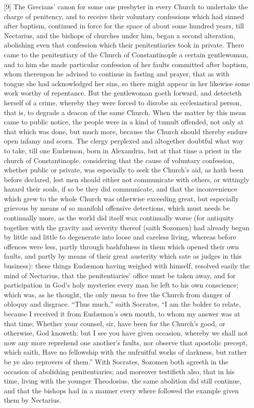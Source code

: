 [9] The Grecians’ canon for some one presbyter in every Church to undertake the charge of penitency, and to receive their voluntary confessions which had sinned after baptism, continued in force for the space of about some hundred years, till Nectarius, and the bishops of churches under him, began a second alteration, abolishing even that confession which their penitentiaries took in private. There came to the penitentiary of the Church of Constantinople a certain gentlewoman, and to him she made particular confession of her faults committed after baptism, whom thereupon he advised to continue in fasting and prayer, that as with tongue she had acknowledged her sins, so there might appear in her likewise some work worthy of repentance. But the gentlewoman goeth forward, and detecteth herself of a crime, whereby they were forced to disrobe an ecclesiastical person, that is, to degrade a deacon of the same Church. When the matter by this mean came to public notice, the people were in a kind of tumult offended, not only at that which was done,  but much more, because the Church should thereby endure open infamy and scorn. The clergy perplexed and altogether doubtful what way to take, till one Eudæmon, born in Alexandria, but at that time a priest in the church of Constantinople, considering that the cause of voluntary confession, whether public or private, was especially to seek the Church’s aid, as hath been before declared, lest men should either not communicate with others, or wittingly hazard their souls, if so be they did communicate, and that the inconvenience which grew to the whole Church was otherwise exceeding great, but especially grievous by means of so manifold offensive detections, which must needs be continually more, as the world did itself wax continually worse (for antiquity together with the gravity and severity thereof (saith Sozomen) had already begun by little and little to degenerate into loose and careless living, whereas before offences were less, partly through bashfulness in them which opened their own faults, and partly by means of their great austerity which sate as judges in this business): these things Eudæmon having weighed with himself, resolved easily the mind of Nectarius, that the penitentiaries’ office must be taken away, and for participation in God’s holy mysteries every man be left to his own conscience; which was, as he thought, the only mean to free the Church from danger of obloquy and disgrace. “Thus much,” saith Socrates, “I am the bolder to relate, because I received it from Eudæmon’s own mouth, to whom my answer was at that time; Whether your counsel, sir, have been for the Church’s good, or otherwise, God knoweth: but I see  you have given occasion, whereby we shall not now any more reprehend one another’s faults, nor observe that apostolic precept, which saith, Have no fellowship with the unfruitful works of darkness, but rather be ye also reprovers of them.” With Socrates, Sozomen both agreeth in the occasion of abolishing penitentiaries; and moreover testifieth also, that in his time, living with the younger Theodosius, the same abolition did still continue, and that the bishops had in a manner every where followed the example given them by Nectarius.


